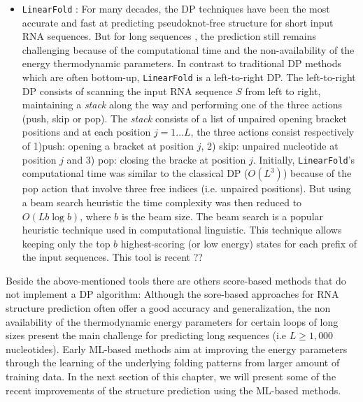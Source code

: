 \begin{itemize}
	\item \texttt{LinearFold} \cite{huang2019linearfold}: For many decades, the DP techniques have been the most accurate and fast at predicting pseudoknot-free structure  for short input RNA sequences. But for long sequences , the prediction still remains challenging because of the computational time and the non-availability of the energy thermodynamic parameters. In contrast to traditional DP methods which are often bottom-up, \texttt{LinearFold} is a left-to-right DP. The left-to-right DP consists of scanning the input RNA sequence $S$ from left to right,  maintaining a \textit{stack} along the way and performing one of the three actions (push, skip or pop). The \textit{stack} consists of a list of unpaired opening bracket positions and at each position $j = 1\dots L$, the three actions consist respectively of 1)push: opening a bracket at position $j$, 2) skip: unpaired nucleotide at position $j$ and 3) pop: closing the bracke at position $j$. Initially, \texttt{LinearFold}'s computational time was similar to the classical DP ($O(L^3)$) because of the pop action that involve three free indices (i.e. unpaired positions). But using a beam search heuristic the time complexity was then reduced to $O(Lb\log  b)$, where $b$ is the beam size. The beam search is a popular heuristic technique used in computational linguistic. This technique allows keeping only the top $b$ highest-scoring (or low energy) states for each prefix of the input sequences. This tool is recent ?? 
\end{itemize}

Beside the above-mentioned tools there are others score-based methods that do not implement a DP algorithm: 
Although the sore-based approaches for RNA structure prediction often offer a good accuracy and generalization,  the non availability of the thermodynamic energy parameters for certain loops of long sizes present the main challenge for predicting long sequences (i.e  $L \geq 1,000$ nucleotides).  Early ML-based methods aim at improving the energy parameters through the learning of the underlying folding patterns from larger amount of training data.  In the next section of this chapter, we will present some of the recent improvements of the structure prediction using the ML-based methods.
